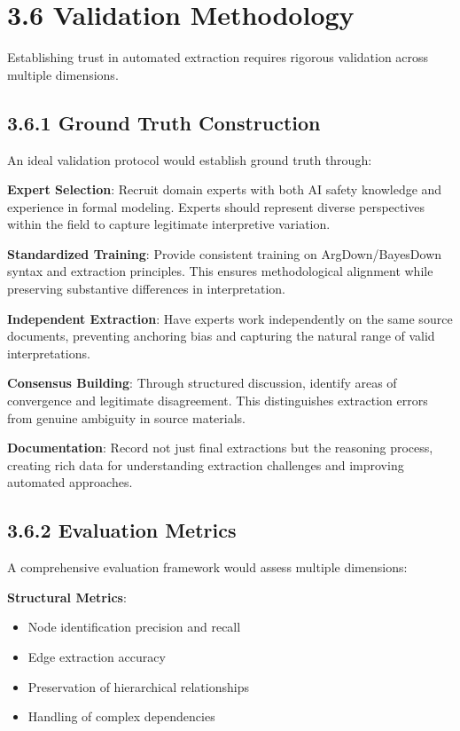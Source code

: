 \documentclass[
  11pt,
  letterpaper,
]{book}
\providecommand{\tightlist}{%
  \setlength{\itemsep}{0pt}\setlength{\parskip}{0pt}}
\begin{document}
\section{3.6 Validation Methodology}\label{sec-validation-methodology}

Establishing trust in automated extraction requires rigorous validation
across multiple dimensions.

\subsection{3.6.1 Ground Truth Construction}\label{sec-ground-truth}

An ideal validation protocol would establish ground truth through:

\textbf{Expert Selection}: Recruit domain experts with both AI safety
knowledge and experience in formal modeling. Experts should represent
diverse perspectives within the field to capture legitimate interpretive
variation.

\textbf{Standardized Training}: Provide consistent training on
ArgDown/BayesDown syntax and extraction principles. This ensures
methodological alignment while preserving substantive differences in
interpretation.

\textbf{Independent Extraction}: Have experts work independently on the
same source documents, preventing anchoring bias and capturing the
natural range of valid interpretations.

\textbf{Consensus Building}: Through structured discussion, identify
areas of convergence and legitimate disagreement. This distinguishes
extraction errors from genuine ambiguity in source materials.

\textbf{Documentation}: Record not just final extractions but the
reasoning process, creating rich data for understanding extraction
challenges and improving automated approaches.

\subsection{3.6.2 Evaluation Metrics}\label{sec-evaluation-metrics}

A comprehensive evaluation framework would assess multiple dimensions:

\textbf{Structural Metrics}:

\begin{itemize}
\tightlist
\item
  Node identification precision and recall
\item
  Edge extraction accuracy
\item
  Preservation of hierarchical relationships
\item
  Handling of complex dependencies
\end{itemize}
\end{document}
